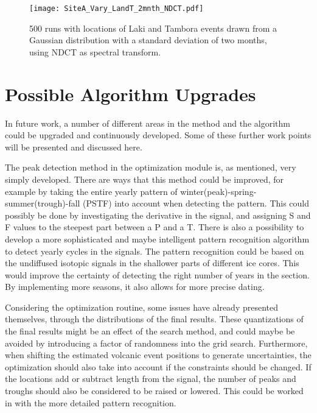 \documentclass[../../CompleteThesis2/Complete_2ndDraft]{subfiles}
\begin{document}
\begin{figure}[!htb]
	\centering
	\texttt{[image: SiteA\_Vary\_LandT\_2mnth\_NDCT.pdf]}
	\caption[2 month variation of event locations, Site A]{\small 500 runs with locations of Laki and Tambora events drawn from a Gaussian distribution with a standard deviation of two months, using NDCT as spectral transform.}
	\label{fig:SiteA_LandT_Gauss_2mnth_NDCT}
\end{figure}



\section[Upgrades][Upgrades]{Possible Algorithm Upgrades}
\label{Sec:Method_Upgrades}
In future work, a number of different areas in the method and the algorithm could be upgraded and continuously developed. Some of these further work points will be presented and discussed here.

The peak detection method in the optimization module is, as mentioned, very simply developed. There are ways that this method could be improved, for example by taking the entire yearly pattern of winter(peak)-spring-summer(trough)-fall (PSTF) into account when detecting the pattern. This could possibly be done by investigating the derivative in the signal, and assigning S and F values to the steepest part between a P and a T. There is also a possibility to develop a more sophisticated and maybe intelligent pattern recognition algorithm to detect yearly cycles in the signals. The pattern recognition could be based on the undiffused isotopic signals in the shallower parts of different ice cores. This would improve the certainty of detecting the right number of years in the section. By implementing more seasons, it also allows for more precise dating.

Considering the optimization routine, some issues have already presented themselves, through the distributions of the final results. These quantizations of the final results might be an effect of the search method, and could maybe be avoided by introducing a factor of randomness into the grid search. Furthermore, when shifting the estimated volcanic event positions to generate uncertainties, the optimization should also take into account if the constraints should be changed. If the locations add or subtract length from the signal, the number of peaks and troughs should also be considered to be raised or lowered. This could be worked in with the more detailed pattern recognition.
\end{document}
